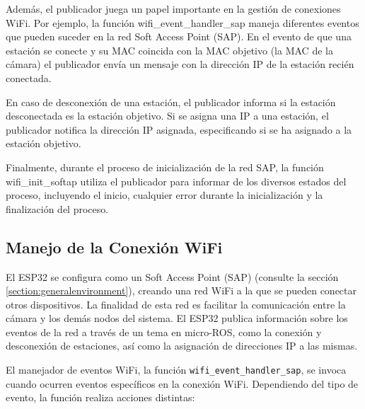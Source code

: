 Además, el publicador juega un papel importante en la gestión de conexiones WiFi. Por ejemplo, la función wifi\_event\_handler\_sap maneja diferentes eventos que pueden suceder en la red Soft Access Point (SAP). En el evento de que una estación se conecte y su MAC coincida con la MAC objetivo (la MAC de la cámara) el publicador envía un mensaje con la dirección IP de la estación recién conectada.



En caso de desconexión de una estación, el publicador informa si la estación desconectada es la estación objetivo. Si se asigna una IP a una estación, el publicador notifica la dirección IP asignada, especificando si se ha asignado a la estación objetivo.



Finalmente, durante el proceso de inicialización de la red SAP, la función wifi\_init\_softap utiliza el publicador para informar de los diversos estados del proceso, incluyendo el inicio, cualquier error durante la inicialización y la finalización del proceso.

\subsection{Manejo de la Conexión WiFi}

El ESP32 se configura como un Soft Access Point (SAP) (consulte la sección \ref{section:generalenvironment}), creando una red WiFi a la que se pueden conectar otros dispositivos. La finalidad de esta red es facilitar la comunicación entre la cámara y los demás nodos del sistema. El ESP32 publica información sobre los eventos de la red a través de un tema en micro-ROS, como la conexión y desconexión de estaciones, así como la asignación de direcciones IP a las mismas.



El manejador de eventos WiFi, la función \texttt{wifi\_event\_handler\_sap}, se invoca cuando ocurren eventos específicos en la conexión WiFi. Dependiendo del tipo de evento, la función realiza acciones distintas:

